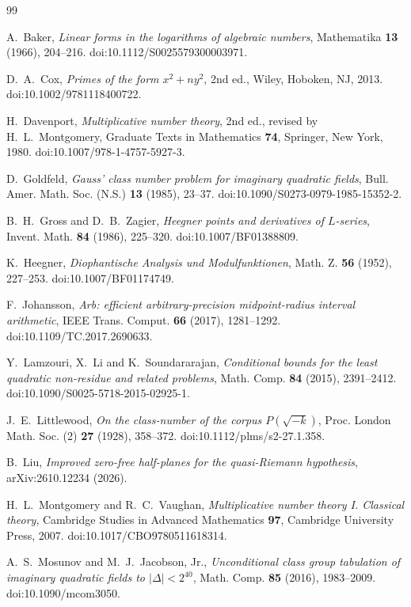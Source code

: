 \documentclass[11pt]{amsart}
\theoremstyle{definition}
\theoremstyle{remark}
\begin{document}
\begin{thebibliography}{99}\raggedright

 A.~Baker, \emph{Linear forms in the logarithms of algebraic numbers}, Mathematika \textbf{13} (1966), 204--216. doi:10.1112/S0025579300003971.

 D.~A.~Cox, \emph{Primes of the form $x^2+ny^2$}, 2nd ed., Wiley, Hoboken, NJ, 2013. doi:10.1002/9781118400722.

 H.~Davenport, \emph{Multiplicative number theory}, 2nd ed., revised by H.~L.~Montgomery, Graduate Texts in Mathematics \textbf{74}, Springer, New York, 1980. doi:10.1007/978-1-4757-5927-3.

 D.~Goldfeld, \emph{Gauss' class number problem for imaginary quadratic fields}, Bull. Amer. Math. Soc. (N.S.) \textbf{13} (1985), 23--37. doi:10.1090/S0273-0979-1985-15352-2.

 B.~H.~Gross and D.~B.~Zagier, \emph{Heegner points and derivatives of $L$-series}, Invent. Math. \textbf{84} (1986), 225--320. doi:10.1007/BF01388809.

 K.~Heegner, \emph{Diophantische Analysis und Modulfunktionen}, Math. Z. \textbf{56} (1952), 227--253. doi:10.1007/BF01174749.

 F.~Johansson, \emph{Arb: efficient arbitrary-precision midpoint-radius interval arithmetic}, IEEE Trans. Comput. \textbf{66} (2017), 1281--1292. doi:10.1109/TC.2017.2690633.

 Y.~Lamzouri, X.~Li and K.~Soundararajan, \emph{Conditional bounds for the least quadratic non-residue and related problems}, Math. Comp. \textbf{84} (2015), 2391--2412. doi:10.1090/S0025-5718-2015-02925-1.

 J.~E.~Littlewood, \emph{On the class-number of the corpus $P(\sqrt{-k})$}, Proc. London Math. Soc. (2) \textbf{27} (1928), 358--372. doi:10.1112/plms/s2-27.1.358.

 B.~Liu, \emph{Improved zero-free half-planes for the quasi-Riemann hypothesis}, arXiv:2610.12234 (2026).

 H.~L.~Montgomery and R.~C.~Vaughan, \emph{Multiplicative number theory I. Classical theory}, Cambridge Studies in Advanced Mathematics \textbf{97}, Cambridge University Press, 2007. doi:10.1017/CBO9780511618314.

 A.~S.~Mosunov and M.~J.~Jacobson, Jr., \emph{Unconditional class group tabulation of imaginary quadratic fields to $|\Delta|<2^{40}$}, Math. Comp. \textbf{85} (2016), 1983--2009. doi:10.1090/mcom3050.


\end{thebibliography}
\end{document}

